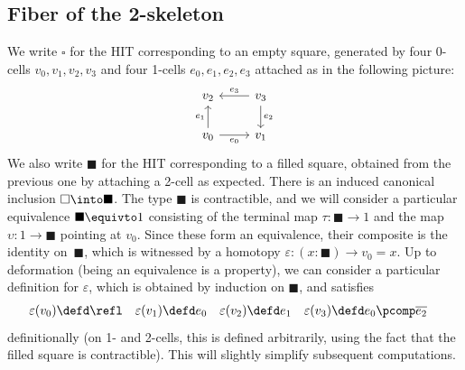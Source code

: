 \documentclass[a4paper]{article}
\begin{document}

\subsection{Fiber of the 2-skeleton}
We write $\square$ for the HIT corresponding to an empty square, generated by four 0-cells $v_0,v_1,v_2,v_3$ and four 1-cells $e_0,e_1,e_2,e_3$ attached as in the following picture:
\[
  \begin{tikzcd}
    v_2&\ar[l,"e_3"']v_3\ar[d,"e_2"]\\
    v_0\ar[u,"e_1"]\ar[r,"e_0"']&v_1
  \end{tikzcd}
\]
We also write $\blacksquare$ for the HIT corresponding to a filled square, obtained from the previous one by attaching a 2-cell as expected. There is an induced canonical inclusion $\square\into\blacksquare$. The type $\blacksquare$ is contractible, and we will consider a particular equivalence $\blacksquare\equivto 1$ consisting of the terminal map $\tau:\blacksquare\to 1$ and the map $\upsilon:1\to\blacksquare$ pointing at $v_0$. Since these form an equivalence, their composite is the identity on~$\blacksquare$, which is witnessed by a homotopy $\varepsilon:(x:\blacksquare)\to v_0=x$. Up to deformation (being an equivalence is a property), we can consider a particular definition for $\varepsilon$, which is obtained by induction on $\blacksquare$, and satisfies
\begin{align*}
  \varepsilon(v_0)&\defd\refl
  &
  \varepsilon(v_1)&\defd e_0
  &
  \varepsilon(v_2)&\defd e_1
  &
  \varepsilon(v_3)&\defd e_0\pcomp\overline{e_2}
\end{align*}
definitionally (on 1- and 2-cells, this is defined arbitrarily, using the fact that the filled square is contractible). This will slightly simplify subsequent computations.
\end{document}
